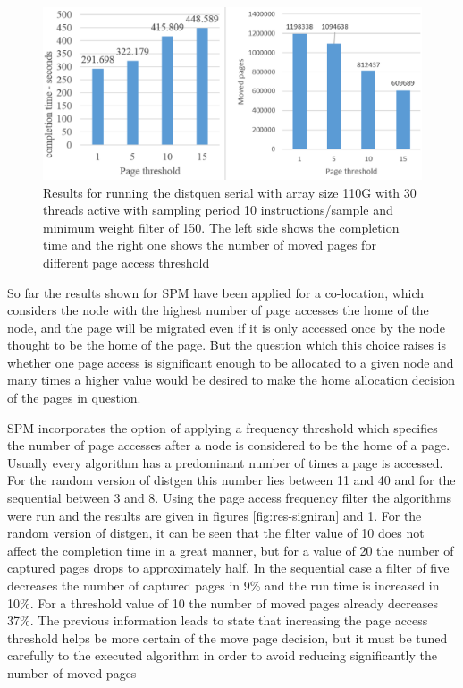 \begin{figure}
	\centering
		\includegraphics[width=.8\textwidth]{figures/signi-seq.eps}
		\caption{Results for running the distquen serial with array size 110G with 30 threads active with sampling period 10 instructions/sample and minimum weight filter of 150. The left side shows the completion time and the right one shows the number of moved pages for different page access threshold}
		\label{fig:res-signiseq}
\end{figure}


So far the results shown for SPM have been applied for a co-location, which considers the node with the highest number of page accesses the home of the node, and the page will be migrated even if it is only accessed once by the node thought to be the home of the page. But the question which this choice raises is whether one page access is significant enough to be allocated to a given node and many times a higher value would be desired to make the home allocation decision of the pages in question. 

SPM incorporates the option of applying a frequency threshold which specifies the number of page accesses after a node is considered to be the home of a page. Usually every algorithm has a predominant number of times a page is accessed. For the random version of distgen this number lies between 11 and 40 and for the sequential between 3 and 8. Using the page access frequency filter the algorithms were run and the results are given in figures \ref{fig:res-signiran} and \ref{fig:res-signiseq}. For the random version of distgen, it can be seen that the filter value of 10 does not affect the completion time in a great manner, but for a value of 20 the number of captured pages drops to approximately half. In the sequential case a filter of five decreases the number of captured pages in 9\% and the run time is increased in 10\%. For a threshold value of 10 the number of moved pages already decreases 37\%.
The previous information leads to state that increasing the page access threshold helps be more certain of the move page decision, but it must be tuned carefully to the executed algorithm in order to avoid reducing significantly the number of moved pages

